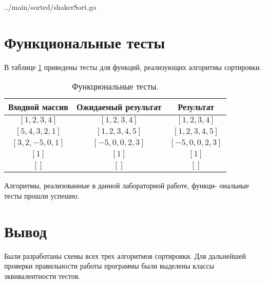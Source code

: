 \noindent
\begin{minipage}{\linewidth}
\begin{lstinputlisting}[
	caption={Реализация алгоритма сортировки перемешивания.},
	label={lst:shaker},
	linerange={3-20}
]{../main/sorted/shakerSort.go}
\end{lstinputlisting}
\end{minipage}

\section{Функциональные тесты}

В таблице \ref{tbl:functional_test} приведены тесты для функций, реализующих алгоритмы сортировки.

\begin{table}[h]
	\begin{center}
		\caption{\label{tbl:functional_test} Функциональные тесты.}
		\begin{tabular}{|c|c|c|}
			\hline
			Входной массив & Ожидаемый результат & Результат \\ 
			\hline
			$[1,2,3,4]$ & $[1,2,3,4]$  & $[1,2,3,4]$\\
			$[5,4,3,2,1]$  & $[1,2,3,4,5]$ & $[1,2,3,4,5]$\\
			$[3,2,-5,0,1]$  & $[-5,0,0,2,3]$  & $[-5,0,0,2,3]$\\
			$[1]$  & $[1]$  & $[1]$\\
			$[]$  & $[]$  & $[]$\\
			\hline
		\end{tabular}
	\end{center}
\end{table}

Алгоритмы, реализованные в данной лабораторной работе, функци-
ональные тесты прошли успешно.

\section*{Вывод}

Были разработаны схемы всех трех алгоритмов сортировки.
Для дальнейшей проверки правильности работы программы были выделены
классы эквивалентности тестов.

